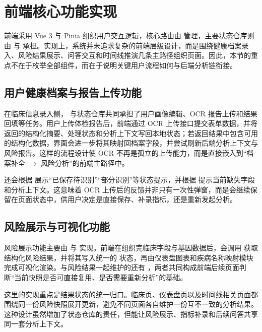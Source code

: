 \section{前端核心功能实现}
\label{sec:frontend_impl}

前端采用 Vue 3 与 Pinia 组织用户交互逻辑，核心路由由  管理，主要状态仓库则由  与  承担。实现上，系统并未追求复杂的前端层级设计，而是围绕健康档案录入、风险结果展示、问答交互和时间线推演几条主路径组织页面。因此，本节的重点不在于枚举全部组件，而在于说明关键用户流程如何与后端分析链衔接。

\subsection{用户健康档案与报告上传功能}

在临床信息录入侧， 与状态仓库共同承担了用户画像编辑、OCR 报告上传和结果回填等任务。用户上传体检报告后，前端通过 OCR 上传接口提交表单数据，并将返回的结构化摘要、处理状态和分析上下文写回本地状态；若返回结果中包含可用的结构化数据，界面会进一步将其映射回档案字段，并尝试刷新后端分析上下文与风险报告。这样的流程设计使 OCR 不再是孤立的上传能力，而是直接嵌入到“档案补全 $\rightarrow$ 风险分析”的前端主路径中。

 还会根据  展示“已保存待识别”“部分识别”等状态提示，并根据  提示当前缺失字段和分析上下文。这意味着 OCR 上传后的反馈并非只有一次性弹窗，而是会继续保留在页面状态中，供用户决定是直接保存、补录指标，还是重新发起分析。

\subsection{风险展示与可视化功能}

风险展示功能主要由  与  实现。前端在组织完临床字段与基因数据后，会调用  获取结构化风险结果，并将其写入统一的  状态，再由仪表盘图表和疾病名称映射模块完成可视化渲染。与风险结果一起维护的还有 ，两者共同构成前端后续页面判断“当前快照是否可直接复用、是否需要重新分析”的基础。

这里的实现重点是结果状态的统一归口。临床页、仪表盘页以及时间线相关页面都围绕同一份风险快照展开更新，避免不同页面各自维护一份互不一致的分析结果。这种设计虽然增加了状态仓库的责任，但能让风险展示、指标补录和后续问答共享同一套分析上下文。


